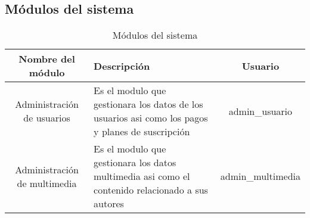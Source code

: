 \documentclass[journal]{IEEEtran}
\begin{document}
\subsection{Módulos del sistema}
\begin{table}[H]
  \centering
  \begin{longtable}{|c | l | c|} 
   \hline
   Nombre del módulo & Descripción & Usuario \\ [0.5ex] 
   \hline
   Administración de usuarios & Es el modulo que gestionara los datos de los usuarios asi como los pagos y planes de suscripción & admin\_usuario \\ 
   \hline
   Administración de multimedia & Es el modulo que gestionara los datos multimedia asi como el contenido relacionado a sus autores & admin\_multimedia \\  [1ex] 
   \hline
  \end{longtable}
  \caption{Módulos del sistema}
  \label{tabla:3}
\end{table}
\end{document}
